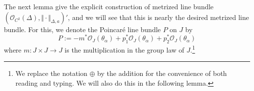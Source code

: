\documentclass[reqno,11pt]{amsart}
\numberwithin{equation}{section}
\theoremstyle{plain}
\theoremstyle{plain}
\numberwithin{equation}{section}
\theoremstyle{remark}
\DeclareMathOperator{\Id}{\operatorname{Id}}
\newcommand{\norm}[1]{\Vert{#1}\Vert}
\begin{document}
The next lemma give the explicit construction of metrized line bundle $(\mathcal{O}_{C^2}(\Delta),\norm{\cdot}_{\Delta,a})'$, and we will see that this is nearly the desired metrized line bundle. For this, we denote the Poincaré line bundle $P$ on $J$ by
$$P:=-m^*\mathcal{O}_{J}(\theta_{\alpha})+p_1^*\mathcal{O}_{J}(\theta_{\alpha})+p_2^*\mathcal{O}_{J}(\theta_{\alpha})$$
where $m:J \times J\longrightarrow J$ is the multiplication in the group law of $J$.\footnote{We replace the notation $\oplus$ by the addition for the convenience of both reading and typing. We will also do this in the following lemma.}
\begin{center}
\end{center}
\end{document}
